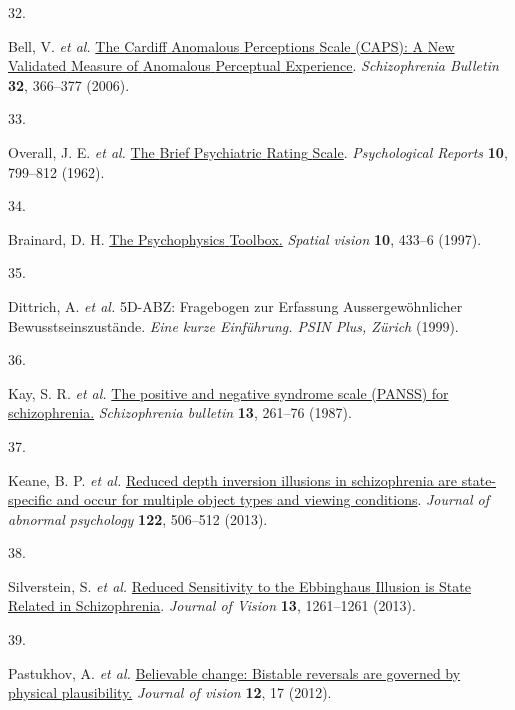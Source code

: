\documentclass[
]{article}
\newlength{\cslhangindent}
\newlength{\csllabelwidth}
\newenvironment{CSLReferences}[2] %
 {\begin{list}{}{%
  \setlength{\itemindent}{0pt}
  \setlength{\leftmargin}{0pt}
  \setlength{\parsep}{0pt}
  \ifodd #1
   \setlength{\leftmargin}{\cslhangindent}
   \setlength{\itemindent}{-1\cslhangindent}
  \fi
  \setlength{\itemsep}{#2\baselineskip}}}
 {\end{list}}
\newcommand{\CSLLeftMargin}[1]{\parbox[t]{\csllabelwidth}{\strut#1\strut}}
\newcommand{\CSLRightInline}[1]{\parbox[t]{\linewidth - \csllabelwidth}{\strut#1\strut}}
\begin{document}
\begin{CSLReferences}{0}{0}
\CSLLeftMargin{32. }%
\CSLRightInline{Bell, V. \emph{et al.}
\href{https://doi.org/10.1093/schbul/sbj014}{The {Cardiff} {Anomalous}
{Perceptions} {Scale} ({CAPS}): {A} {New} {Validated} {Measure} of
{Anomalous} {Perceptual} {Experience}}. \emph{Schizophrenia Bulletin}
\textbf{32}, 366--377 (2006).}

\CSLLeftMargin{33. }%
\CSLRightInline{Overall, J. E. \emph{et al.}
\href{https://doi.org/10.2466/pr0.1962.10.3.799}{The {Brief}
{Psychiatric} {Rating} {Scale}}. \emph{Psychological Reports}
\textbf{10}, 799--812 (1962).}

\CSLLeftMargin{34. }%
\CSLRightInline{Brainard, D. H.
\href{https://www.ncbi.nlm.nih.gov/pubmed/9176952}{The {Psychophysics}
{Toolbox}.} \emph{Spatial vision} \textbf{10}, 433--6 (1997).}

\CSLLeftMargin{35. }%
\CSLRightInline{Dittrich, A. \emph{et al.} {5D}-{ABZ}: {Fragebogen} zur
{Erfassung} {Aussergewöhnlicher} {Bewusstseinszustände}. \emph{Eine
kurze Einführung. PSIN Plus, Zürich} (1999).}

\CSLLeftMargin{36. }%
\CSLRightInline{Kay, S. R. \emph{et al.}
\href{https://www.ncbi.nlm.nih.gov/pubmed/3616518}{The positive and
negative syndrome scale ({PANSS}) for schizophrenia.}
\emph{Schizophrenia bulletin} \textbf{13}, 261--76 (1987).}

\CSLLeftMargin{37. }%
\CSLRightInline{Keane, B. P. \emph{et al.}
\href{https://doi.org/10.1037/a0032110}{Reduced depth inversion
illusions in schizophrenia are state-specific and occur for multiple
object types and viewing conditions}. \emph{Journal of abnormal
psychology} \textbf{122}, 506--512 (2013).}

\CSLLeftMargin{38. }%
\CSLRightInline{Silverstein, S. \emph{et al.}
\href{https://doi.org/10.1167/13.9.1261}{Reduced {Sensitivity} to the
{Ebbinghaus} {Illusion} is {State} {Related} in {Schizophrenia}}.
\emph{Journal of Vision} \textbf{13}, 1261--1261 (2013).}

\CSLLeftMargin{39. }%
\CSLRightInline{Pastukhov, A. \emph{et al.}
\href{https://doi.org/10.1167/12.1.17}{Believable change: Bistable
reversals are governed by physical plausibility.} \emph{Journal of
vision} \textbf{12}, 17 (2012).}


\end{CSLReferences}
\end{document}
